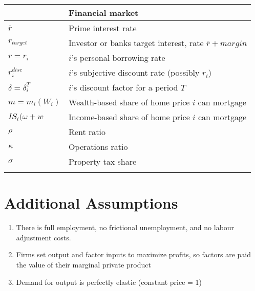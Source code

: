 \begin{longtable}{lp{10cm}}
\hline       & \textbf{Financial market} \\ \hline
$\bar r$     &  Prime interest rate      \\
$r_{target}$ &  Investor or banks target interest, rate $\bar r + margin$ \\
$r =  r_i$        &  $i$'s personal borrowing rate  \\
$r_i^{disc}$ &  $i$'s subjective discount rate (possibly $r_i$)           \\
$\delta = \delta_i^T$ &  $i$'s discount factor for a period $T$           \\
$m = m_i(W_i)$   &  Wealth-based share of home price $i$ can mortgage     \\
$IS_i(\omega+w$  &  Income-based share of home price $i$ can mortgage     \\
$\rho$       &  Rent ratio             \\
$\kappa$     &  Operations ratio       \\
$\sigma$     &  Property tax share     \\ %
\hline
\color{black}
\end{longtable}  



\section{Additional Assumptions}
\begin{enumerate}
\item There is full employment, no frictional unemployment, and no labour adjustment costs.
\item Firms set output and factor inputs to maximize profits, so factors are paid the value of their marginal private product
\item Demand for output is perfectly elastic (constant price = 1)

\end{enumerate}

